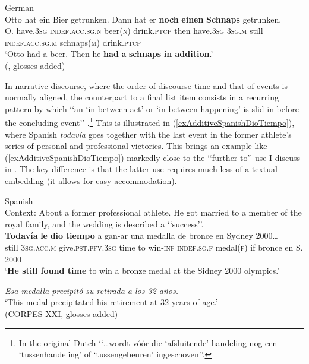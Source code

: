 \begin{exe}
	\ex German\label{exAdditiveSchnaps}\\
	\gll Otto hat ein Bier getrunken. Dann hat er \textbf{noch} \textbf{einen} \textbf{Schnaps} getrunken.\\
	O. have.3\textsc{sg} \textsc{indef}.\textsc{acc}.\textsc{sg}.\textsc{n} beer(\textsc{n}) drink.\textsc{ptcp} then have.3\textsc{sg} 3\textsc{sg}.\textsc{m} still \textsc{indef}.\textsc{acc}.\textsc{sg}.\textsc{m} schnaps(\textsc{m}) drink.\textsc{ptcp}\\
	\glt \lq Otto had a beer. Then he \textbf{had} \textbf{a} \textbf{schnaps} \textbf{in addition}.\rq{}
	\\(\cite[1850]{Umbach2012}, glosses added)
\end{exe}

In narrative discourse, where the order of discourse time and that of events is normally aligned, the counterpart to a final list item consists in a recurring pattern by which \lq\lq an \lq in-between act' or \lq in-between happening\rq{} is slid in before the concluding event\rq\rq{ }\parencite[130]{Vandeweghe1984}.\footnote{In the original Dutch \lq\lq …wordt vóór die \lq afsluitende' handeling nog een \lq tussenhandeling' of \lq tussengebeuren' ingeschoven\rq\rq{}.} This is illustrated in (\ref{exAdditiveSpanishDioTiempo}), where Spanish \textit{todavía} goes together with the last event in the former athlete's series of personal and professional victories. This brings an example like (\ref{exAdditiveSpanishDioTiempo}) markedly close to the \lq\lq further-to\rq\rq{ }use I discuss in . The key difference is that the latter use requires much less of a textual embedding (it allows for easy accommodation).

\begin{exe}
		\ex Spanish\label{exAdditiveSpanishDioTiempo}\\
		Context: About a former professional athlete. He got married to a member of the royal family, and the wedding is described a \lq\lq success\rq\rq{}.\\
	\gll \textbf{Todavía} \textbf{le} \textbf{dio} \textbf{tiempo} a gan-ar una medalla de bronce en Sydney 2000…\\
	still 3\textsc{sg}.\textsc{acc}.\textsc{m} give.\textsc{pst}.\textsc{pfv}.3\textsc{sg} time to win-\textsc{inf} \textsc{indef}.\textsc{sg}.\textsc{f} medal(\textsc{f}) if bronce en S. 2000\\
	 \glt \lq \textbf{He still found time} to win a bronze medal at the Sidney 2000 olympics.\rq{}
	 
	\exi{} \textit{Esa medalla precipitó su retirada a los 32 años.}\\
	 \lq This medal precipitated his retirement at 32 years of age.\rq{}
	 \\(CORPES XXI, glosses added)
\end{exe}

